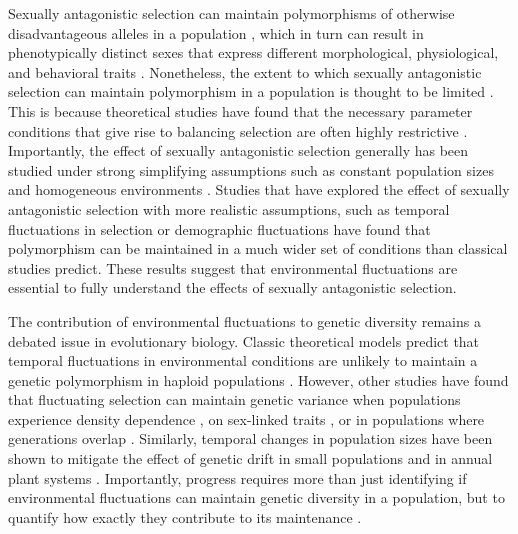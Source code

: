 \documentclass[12pt]{article}
\begin{document}
Sexually antagonistic selection can maintain polymorphisms of otherwise disadvantageous alleles in a population \citep{gavrilets2014sexual}, which in turn can result in phenotypically distinct sexes that express different morphological, physiological, and behavioral traits \citep{mori2017sexual,connallon2018environmental}. Nonetheless,
the extent to which sexually antagonistic selection can maintain polymorphism in a population is thought to be limited \citep{connallon2012general,connallon2018environmental}. This is because theoretical studies have found that the necessary parameter conditions that give rise to balancing selection are often highly restrictive \citep{kidwell1977regions,pamilo1979genic,hedrick1999antagonistic,curtsinger1994antagonistic, patten2010fitness, jordan2012potential}. Importantly, the effect of sexually antagonistic selection generally has been studied under strong simplifying assumptions such as constant population sizes and homogeneous environments  \citep{kidwell1977regions, pamilo1979genic, immler2012ploidally, jordan2012potential}. Studies that have explored the effect of sexually antagonistic selection with more realistic assumptions, such as temporal fluctuations in selection \citep{connallon_evolutionary_2018} or demographic fluctuations \citep{connallon2012general} have found that polymorphism can be maintained in a much wider set of conditions than classical studies predict. These results suggest that environmental fluctuations are essential to fully understand the effects of sexually antagonistic selection.

The contribution of environmental fluctuations to genetic diversity remains a debated issue in evolutionary biology. Classic theoretical models predict that temporal fluctuations in environmental conditions are unlikely to maintain a genetic polymorphism in haploid populations \citep{dempster1955maintenance,hedrick1974genetic,hedrick1986genetic}. However, other studies have found that fluctuating selection can maintain genetic variance when populations experience density dependence \citep{dean2005protecting}, on sex-linked traits \citep{reinhold2000maintenance}, or in populations where generations overlap \citep{ellner1994role, ellner1996patterns}. Similarly, temporal changes in population sizes have been shown to mitigate the effect of genetic drift in small populations \citep{pemberton1996maintenance} and in annual plant systems \citep{nunney2002effective}. Importantly, progress requires more than just identifying if environmental fluctuations can maintain genetic diversity in a population, but to quantify how exactly they contribute to its maintenance \citep{ellner2016quantify}.
\end{document}
